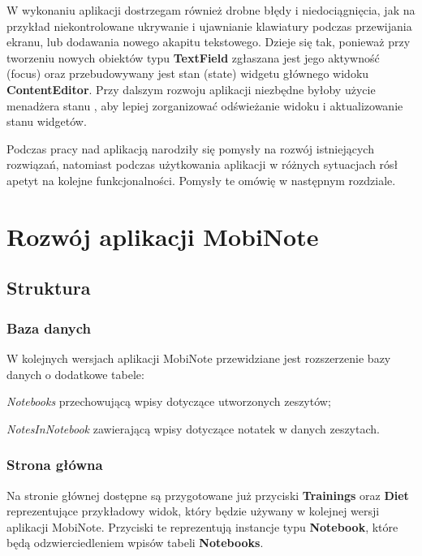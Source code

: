 W wykonaniu aplikacji dostrzegam również drobne błędy i niedociągnięcia, jak na przykład niekontrolowane ukrywanie i ujawnianie klawiatury podczas przewijania ekranu, lub dodawania nowego akapitu tekstowego. Dzieje się tak, ponieważ przy tworzeniu nowych obiektów typu \textbf{TextField} zgłaszana jest jego aktywność (focus) oraz przebudowywany jest stan (state) widgetu głównego widoku \textbf{ContentEditor}. Przy dalszym rozwoju aplikacji niezbędne byłoby użycie menadżera stanu \cite{sateManagement}, aby lepiej zorganizować odświeżanie widoku i aktualizowanie stanu widgetów.

Podczas pracy nad aplikacją narodziły się pomysły na rozwój istniejących rozwiązań, natomiast podczas użytkowania aplikacji w różnych sytuacjach rósł apetyt na kolejne funkcjonalności. Pomysły te omówię w następnym rozdziale.

\chapter{Rozwój aplikacji MobiNote}
\label{ch:rozwoj}

\section{Struktura}

\subsection{Baza danych}

W kolejnych wersjach aplikacji MobiNote przewidziane jest rozszerzenie bazy danych o dodatkowe tabele:
\begin{compactitem}
    \item \textit{Notebooks} przechowującą wpisy dotyczące utworzonych zeszytów;
    \item \textit{NotesInNotebook} zawierającą wpisy dotyczące notatek w danych zeszytach.
\end{compactitem}

\subsection{Strona główna}

Na stronie głównej dostępne są przygotowane już przyciski \textbf{Trainings} oraz \textbf{Diet} reprezentujące przykładowy widok, który będzie używany w kolejnej wersji aplikacji MobiNote. Przyciski te reprezentują instancje typu \textbf{Notebook}, które będą odzwierciedleniem wpisów tabeli \textbf{Notebooks}.

